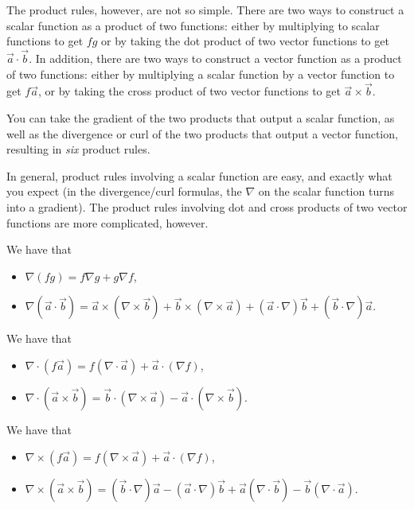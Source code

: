 The product rules, however, are not so simple.
There are two ways to construct a scalar function as a product of two functions:
either by multiplying to scalar functions to get $fg$
or by taking the dot product of two vector functions to get $\vec{a}\cdot\vec{b}$.
In addition, there are two ways to construct a vector function as a product of two functions:
either by multiplying a scalar function by a vector function to get $f\vec{a}$,
or by taking the cross product of two vector functions to get $\vec{a}\times\vec{b}$.

You can take the gradient of the two products that output a scalar function,
as well as the divergence or curl of the two products that output a vector function,
resulting in \textit{six} product rules.

In general, product rules involving a scalar function are easy, and exactly what you expect (in the divergence/curl formulas, the $\nabla$ on the scalar function turns into a gradient). The product rules involving dot and cross products of two vector functions are more complicated, however.

\begin{proposition}
    We have that
    \begin{itemize}
        \item $\nabla(fg)=f\nabla g+g\nabla f$,
        \item $\nabla(\vec{a}\cdot\vec{b}) = \vec{a}\times(\nabla\times \vec{b}) + \vec{b}\times(\nabla\times \vec{a})+(\vec{a}\cdot\nabla)\vec{b}+(\vec{b}\cdot\nabla)\vec{a}$.
    \end{itemize}
\end{proposition}

\begin{proposition}
    We have that
    \begin{itemize}
        \item $\nabla\cdot(f\vec{a})=f(\nabla\cdot\vec{a})+\vec{a}\cdot(\nabla f)$,
        \item $\nabla\cdot(\vec{a}\times\vec{b})=\vec{b}\cdot(\nabla\times\vec{a})-\vec{a}\cdot(\nabla\times\vec{b})$.
    \end{itemize}
\end{proposition}

\begin{proposition}
    We have that
    \begin{itemize}
        \item $\nabla\times(f\vec{a})=f(\nabla\times\vec{a})+\vec{a}\cdot(\nabla f)$,
        \item $\nabla\times(\vec{a}\times\vec{b})=(\vec{b}\cdot \nabla)\vec{a}-(\vec{a}\cdot\nabla)\vec{b}+\vec{a}(\nabla\cdot\vec{b})-\vec{b}(\nabla\cdot\vec{a})$.
    \end{itemize}
\end{proposition}

